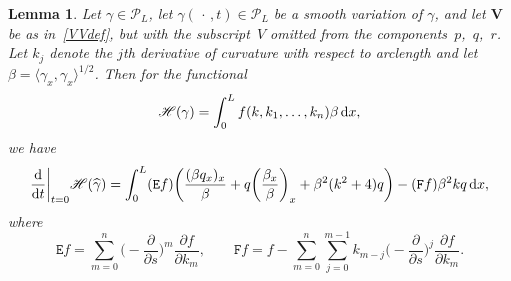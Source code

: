 \documentclass[10pt,a4paper]{amsart}
\newcommand\Leg{ {\mathcal P}} %
\def\Fop{\mathtt F} %
\def\Euler{\mathtt E}
\newcommand\kk{k} %
\newcommand\speed{\beta} %
\newcommand\VV{\mathbf V}
\newcommand\funH{{\mathscr H}} %
\newcommand{\dx}{\,{\rm d}x}
\def\gam{\gamma} %
\def\di{\partial}
\newcommand\gamf{\widehat{\gam}} %
\numberwithin{equation}{section}
\newtheorem{Lemma}[Theorem]{Lemma}
\begin{document}
\begin{Lemma}\label{grunge} Let $\gam \in \Leg_L$, let $\gamf(\, \cdot\, ,t)\in \Leg_L$ be a smooth variation of $\gam$, and let $\VV$ be as
in~\eqref{VVdef}, but with the subscript~$V$ omitted from the components~$p$,~$q$,~$r$. Let $\kk_j$ denote the $j$th derivative of curvature with respect to arclength and let $\speed = \langle \gam_x, \gam_x \rangle^{1/2}$. Then for the functional
\[
\funH(\gam) = \int_0^L f(\kk, \kk_1, \ldots, \kk_n) \speed \dx,
\]
we have
\[
\dfrac{{\rm d}}{{\rm d}t}\bigg|_{t=0} \funH(\gamf)
=\int_{0}^{L} (\Euler f)\biggl( \dfrac{(\speed q_x)_x}{\speed}
+ q\biggl( \dfrac{\speed_x}{\speed}\biggr)_x
+ \speed^2(\kk^2 + 4) q\biggr) - (\Fop f) \speed^2 k q \dx,
\]
where
\[
\Euler f = \sum_{m=0}^n \biggl(- \dfrac{\di}{\di s}\biggr)^m \dfrac{\partial f}{\partial \kk_m}, \qquad
\Fop f = f - \sum_{m=0}^n \sum_{j=0}^{m-1}\kk_{m-j}\biggl(- \dfrac{\di}{\di s}\biggr)^j \dfrac{\partial f}{\partial \kk_m}.
\]
\end{Lemma}
\end{document}
